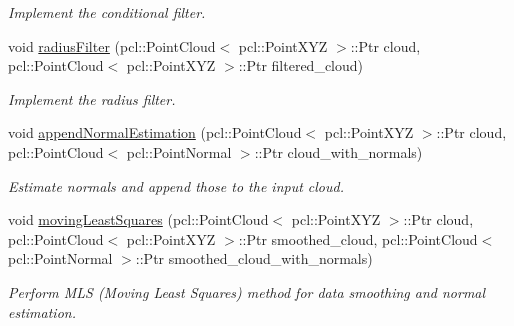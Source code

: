 \begin{DoxyCompactItemize}
\begin{DoxyCompactList}\small\item\em Implement the conditional filter. \end{DoxyCompactList}\item 
void \hyperlink{classhull__abstraction_1_1_preprocessor_aef6ccdc23a770af04eb6fc1d34aceff9}{radius\+Filter} (pcl\+::\+Point\+Cloud$<$ pcl\+::\+Point\+X\+YZ $>$\+::Ptr cloud, pcl\+::\+Point\+Cloud$<$ pcl\+::\+Point\+X\+YZ $>$\+::Ptr filtered\+\_\+cloud)
\begin{DoxyCompactList}\small\item\em Implement the radius filter. \end{DoxyCompactList}\item 
void \hyperlink{classhull__abstraction_1_1_preprocessor_a9768f4de4320607118636323343b5b5c}{append\+Normal\+Estimation} (pcl\+::\+Point\+Cloud$<$ pcl\+::\+Point\+X\+YZ $>$\+::Ptr cloud, pcl\+::\+Point\+Cloud$<$ pcl\+::\+Point\+Normal $>$\+::Ptr cloud\+\_\+with\+\_\+normals)
\begin{DoxyCompactList}\small\item\em Estimate normals and append those to the input cloud. \end{DoxyCompactList}\item 
void \hyperlink{classhull__abstraction_1_1_preprocessor_adb771d9dfac554a7dd35db7d9acc3ca3}{moving\+Least\+Squares} (pcl\+::\+Point\+Cloud$<$ pcl\+::\+Point\+X\+YZ $>$\+::Ptr cloud, pcl\+::\+Point\+Cloud$<$ pcl\+::\+Point\+X\+YZ $>$\+::Ptr smoothed\+\_\+cloud, pcl\+::\+Point\+Cloud$<$ pcl\+::\+Point\+Normal $>$\+::Ptr smoothed\+\_\+cloud\+\_\+with\+\_\+normals)
\begin{DoxyCompactList}\small\item\em Perform M\+LS (Moving Least Squares) method for data smoothing and normal estimation. \end{DoxyCompactList}\end{DoxyCompactItemize}
